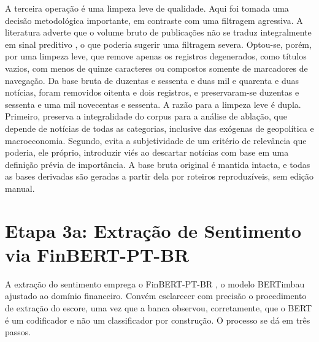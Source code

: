 A terceira operação é uma limpeza leve de qualidade. Aqui foi tomada uma decisão metodológica importante, em contraste com uma filtragem agressiva. A literatura adverte que o volume bruto de publicações não se traduz integralmente em sinal preditivo \cite{nizer_metodo_2011}, o que poderia sugerir uma filtragem severa. Optou-se, porém, por uma limpeza leve, que remove apenas os registros degenerados, como títulos vazios, com menos de quinze caracteres ou compostos somente de marcadores de navegação. Da base bruta de duzentas e sessenta e duas mil e quarenta e duas notícias, foram removidos oitenta e dois registros, e preservaram-se duzentas e sessenta e uma mil novecentas e sessenta. A razão para a limpeza leve é dupla. Primeiro, preserva a integralidade do corpus para a análise de ablação, que depende de notícias de todas as categorias, inclusive das exógenas de geopolítica e macroeconomia. Segundo, evita a subjetividade de um critério de relevância que poderia, ele próprio, introduzir viés ao descartar notícias com base em uma definição prévia de importância. A base bruta original é mantida intacta, e todas as bases derivadas são geradas a partir dela por roteiros reproduzíveis, sem edição manual.

\section{Etapa 3a: Extração de Sentimento via FinBERT-PT-BR}

A extração do sentimento emprega o FinBERT-PT-BR \cite{santos_finbert_2023}, o modelo BERTimbau ajustado ao domínio financeiro. Convém esclarecer com precisão o procedimento de extração do escore, uma vez que a banca observou, corretamente, que o BERT é um codificador e não um classificador por construção. O processo se dá em três passos.

